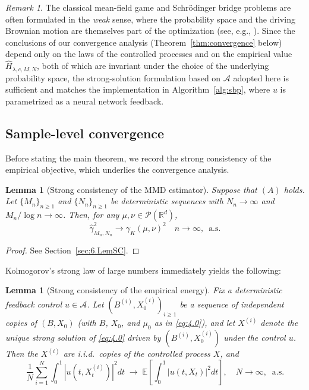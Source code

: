 \documentclass[11pt,leqno]{article}
\theoremstyle{plain}
\newtheorem{lem}[thm]{Lemma}
\theoremstyle{remark}
\newtheorem{rem}[thm]{Remark}
\theoremstyle{definition}
\numberwithin{equation}{section}
\numberwithin{figure}{section}
\numberwithin{table}{section}
\numberwithin{algorithm}{section}
\newcommand{\EE}{\mathbb{E}}
\newcommand{\RR}{\mathbb{R}}
\newcommand{\cP}{\mathcal{P}}
\begin{document}
\begin{rem}\label{rem:weak_vs_strong}
The classical mean-field game and Schr{\"o}dinger bridge problems are often formulated in the \emph{weak} sense,
where the probability space and the driving Brownian motion are themselves part of the optimization
(see, e.g., \cite{leo:2014}).
Since the conclusions of our convergence analysis (Theorem~\ref{thm:convergence} below)
depend only on the laws of the controlled processes and on the empirical value $\hat H_{\lambda,c,M,N}$,
both of which are invariant under the choice of the underlying probability space,
the strong-solution formulation based on $\mathcal{A}$ adopted here is sufficient
and matches the implementation in Algorithm~\ref{alg:sbp},
where $u$ is parametrized as a neural network feedback.
\end{rem}

\subsection{Sample-level convergence}\label{sec:4.2conv}



Before stating the main theorem, we record the strong consistency of the empirical objective,
which underlies the convergence analysis.

\begin{lem}[Strong consistency of the MMD estimator]\label{lem:strong_consistency}
Suppose that $(A)$ holds.
Let $\{M_n\}_{n\ge 1}$ and $\{N_n\}_{n\ge 1}$ be deterministic sequences with $N_n\to\infty$
and $M_n/\log n\to\infty$.
Then, for any $\mu,\nu\in\cP(\RR^d)$,
\[
 \hat{\gamma}_{M_n,N_n}^2 \longrightarrow \gamma_K(\mu,\nu)^2 \quad n\to\infty, \:\;\text{a.s.}
\]
\end{lem}

\begin{proof}
See Section~\ref{sec:6.LemSC}.
\end{proof}

Kolmogorov's strong law of large numbers immediately yields the following: 
\begin{lem}[Strong consistency of the empirical energy]\label{lem:energy_consistency}
Fix a deterministic feedback control $u\in\mathcal{A}$.
Let $(B^{(i)},X_0^{(i)})_{i\ge 1}$ be a sequence of independent copies of $(B,X_0)$
(with $B$, $X_0$, and $\mu_0$ as in \eqref{eq:4.0}),
and let $X^{(i)}$ denote the unique strong solution of \eqref{eq:4.0} driven by $(B^{(i)},X_0^{(i)})$ under the control $u$.
Then the $X^{(i)}$ are i.i.d.\ copies of the controlled process $X$, and
\[
 \frac{1}{N}\sum_{i=1}^N \int_0^1 |u(t,X_t^{(i)})|^2 dt
 \;\longrightarrow\; \EE\!\left[\int_0^1 |u(t,X_t)|^2 dt\right], \quad N\to\infty, \;\;\text{a.s.}
\]
\end{lem}
\end{document}
